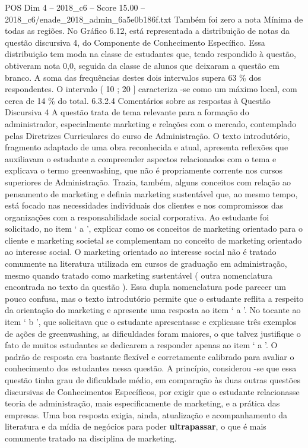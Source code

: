 \begin{textsample}{POS Dim 4 – 2018\_c6 – Score 15.00 – 2018\_c6/enade\_2018\_admin\_6a5e0b186f.txt}
Também foi zero a nota Mínima de todas as regiões.
No Gráfico 6.12, está representada a distribuição de notas da questão discursiva 4, do Componente de Conhecimento Específico.
Essa distribuição tem moda na classe de estudantes que, tendo respondido à questão, obtiveram nota 0,0, seguida da classe de alunos que deixaram a questão em branco.
A soma das frequências destes dois intervalos supera 63 \% dos respondentes.
O intervalo ( 10 ; 20 ] caracteriza -se como um máximo local, com cerca de 14 \% do total. 6.3.2.4 Comentários sobre as respostas à Questão Discursiva 4 A questão trata de tema relevante para a formação do administrador, especialmente marketing e relações com o mercado, contemplado pelas Diretrizes Curriculares do curso de Administração.
O texto introdutório, fragmento adaptado de uma obra reconhecida e atual, apresenta reflexões que auxiliavam o estudante a compreender aspectos relacionados com o tema e explicava o termo greenwashing, que não é propriamente corrente nos cursos superiores de Administração.
Trazia, também, alguns conceitos com relação ao pensamento de marketing e definia marketing sustentável que, ao mesmo tempo, está focado nas necessidades individuais dos clientes e nos compromissos das organizações com a responsabilidade social corporativa.
Ao estudante foi solicitado, no item ‘ a ’, explicar como os conceitos de marketing orientado para o cliente e marketing societal se complementam no conceito de marketing orientado ao interesse social.
O marketing orientado ao interesse social não é tratado comumente na literatura utilizada em cursos de graduação em administração, mesmo quando tratado como marketing sustentável ( outra nomenclatura encontrada no texto da questão ).
Essa dupla nomenclatura pode parecer um pouco confusa, mas o texto introdutório permite que o estudante reflita a respeito da orientação do marketing e apresente uma resposta ao item ‘ a ’.
No tocante ao item ‘ b ’, que solicitava que o estudante apresentasse e explicasse três exemplos de ações de greenwashing, as dificuldades foram maiores, o que talvez justifique o fato de muitos estudantes se dedicarem a responder apenas ao item ‘ a ’.
O padrão de resposta era bastante flexível e corretamente calibrado para avaliar o conhecimento dos estudantes nessa questão.
A princípio, considerou -se que essa questão tinha grau de dificuldade médio, em comparação às duas outras questões discursivas de Conhecimentos Específicos, por exigir que o estudante relacionasse teoria de administração, mais especificamente de marketing, e a prática das empresas.
Uma boa resposta exigia, ainda, atualização e acompanhamento da literatura e da mídia de negócios para poder \textbf{ultrapassar}, o que é mais comumente tratado na disciplina de marketing.

\end{textsample}
